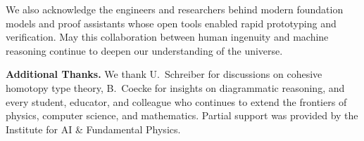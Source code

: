 We also acknowledge the engineers and researchers behind modern foundation models and proof assistants whose open tools enabled rapid prototyping and verification.  May this collaboration between human ingenuity and machine reasoning continue to deepen our understanding of the universe.

\bigskip
\noindent\textbf{Additional Thanks.}  We thank U.~Schreiber for discussions on cohesive homotopy type theory, B.~Coecke for insights on diagrammatic reasoning, and every student, educator, and colleague who continues to extend the frontiers of physics, computer science, and mathematics.  Partial support was provided by the Institute for AI \& Fundamental Physics.
